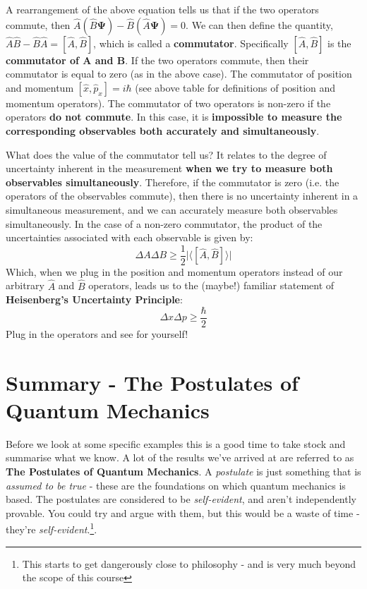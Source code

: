 \documentclass{memoir}[11pt,oneside,a4paper,openany]
\newcommand{\wf}{\ensuremath{\bm{\Psi}}\xspace}
\begin{document}
A rearrangement of the above equation tells us that if the two operators commute, then $\hat{A}(\hat{B}\wf)-\hat{B}(\hat{A}\wf) = 0$. We can then define the quantity, $\hat{A}\hat{B}-\hat{B}\hat{A} = [\hat{A},\hat{B}]$, which is called a \textbf{commutator}. Specifically $[\hat{A},\hat{B}]$ is the \textbf{commutator of A and B}. If the two operators commute, then their commutator is equal to zero (as in the above case). The commutator of position and momentum $[\hat{x},\hat{p}_x] = i\hbar$ (see above table for definitions of position and momentum operators). The commutator of two operators is non-zero if the operators \textbf{do not commute}. In this case, it is \textbf{impossible to measure the corresponding observables both accurately and simultaneously}.

What does the value of the commutator tell us? It relates to the degree of uncertainty inherent in the measurement \textbf{when we try to measure both observables simultaneously}. Therefore, if the commutator is zero (i.e. the operators of the observables commute), then there is no uncertainty inherent in a simultaneous measurement, and we can accurately measure both observables simultaneously. In the case of a non-zero commutator, the product of the uncertainties associated with each observable is given by:
\begin{equation}
	\Delta A \Delta B \geq \frac{1}{2} \lvert \langle [\hat{A},\hat{B}] \rangle \rvert
\end{equation}
Which, when we plug in the position and momentum operators instead of our arbitrary $\hat{A}$ and $\hat{B}$ operators, leads us to the (maybe!) familiar statement of \textbf{Heisenberg's Uncertainty Principle}:
\begin{equation}
	\Delta x \Delta p \geq \frac{\hbar}{2}
\end{equation}
Plug in the operators and see for yourself!

\section{Summary - The Postulates of Quantum Mechanics}
Before we look at some specific examples this is a good time to take stock and summarise what we know. A lot of the results we've arrived at are referred to as \textbf{The Postulates of Quantum Mechanics}. A \emph{postulate} is just something that is \emph{assumed to be true} - these are the foundations on which quantum mechanics is based. The postulates are considered to be \emph{self-evident}, and aren't independently provable. You could try and argue with them, but this would be a waste of time - they're \emph{self-evident}.\footnote{This starts to get dangerously close to philosophy - and is very much beyond the scope of this course}.
\end{document}

